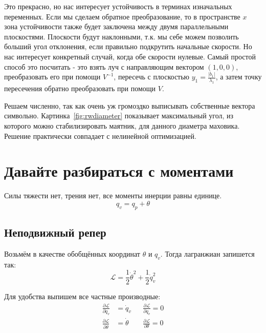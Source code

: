 \documentclass{article}
\begin{document}
Это прекрасно, но нас интересует устойчивость в терминах изначальных переменных.
Если мы сделаем обратное преобразование, то в пространстве $x$ зона устойчивости также будет заключена между двумя параллельными плоскостями.
Плоскости будут наклонными, т.к. мы себе можем позволить больший угол отклонения, если правильно подкрутить начальные скорости.
Но нас интересует конкретный случай, когда обе скорости нулевые. Самый простой способ это посчитать - это взять луч с направляющим вектором $(1,0,0)$, преобразовать его при помощи $V^{-1}$,
пересечь с плоскостью $y_1 = \frac{|b_1|}{\lambda_1}$, а затем точку пересечения обратно преобразовать при помощи $V$.

Решаем численно, так как очень уж громоздко выписывать собственные вектора символьно.
Картинка~\ref{fig:rwdiameter} показывает максимальный угол, из которого можно стабилизировать маятник, для данного диаметра маховика.
Решение практически совпадает с нелинейной оптимизацией.



\iffalse

\newpage
\section{Давайте разбираться с моментами}
Силы тяжести нет, трения нет, все моменты инерции равны единице.
$$
q_v = q_p + \theta
$$

\subsection{Неподвижный репер}

Возьмём в качестве обобщённых координат $\theta$ и $q_v$. Тогда лагранжиан запишется так:
$$
\mathcal{L} = \frac{1}{2} \dot \theta^2 + \frac{1}{2}\dot q^2_v
$$

Для удобства выпишем все частные производные:
\begin{align*}
\frac{\partial\mathcal L}{\partial\dot q_v} &= \dot q_v   && \frac{\partial\mathcal L}{\partial q_v} = 0\\
\frac{\partial\mathcal L}{\partial\dot\theta} &= \dot\theta && \frac{\partial\mathcal L}{\partial\theta} = 0\\
\end{align*}
\end{document}
